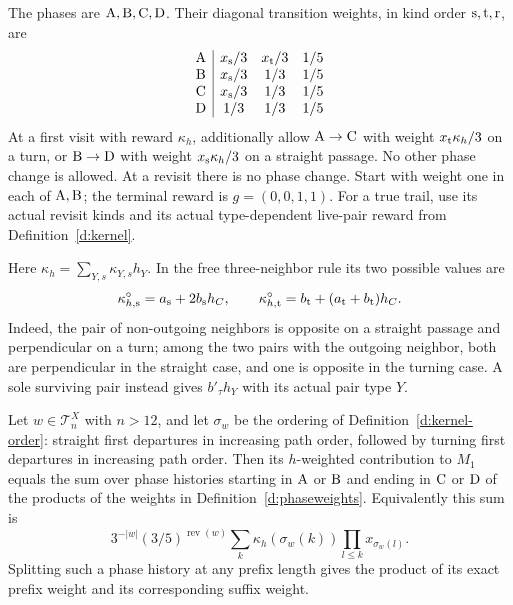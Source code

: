 \begin{definition}\label{d:phaseweights}
The phases are \({\rm A},{\rm B},{\rm C},{\rm D}\). Their
diagonal transition weights, in kind order \({\rm s},{\rm t},{\rm r}\), are
\[
 \begin{array}{c|ccc}
 {\rm A}&x_{\rm s}/3&x_{\rm t}/3&1/5\\
 {\rm B}&x_{\rm s}/3&1/3&1/5\\
 {\rm C}&x_{\rm s}/3&1/3&1/5\\
 {\rm D}&1/3&1/3&1/5
 \end{array}
\]
At a first visit with reward \(\kappa_h\), additionally allow
\({\rm A}\to{\rm C}\) with weight \(x_{\rm t}\kappa_h/3\) on a turn,
or \({\rm B}\to{\rm D}\) with weight \(x_{\rm s}\kappa_h/3\)
on a straight passage. No other phase change is allowed.
At a revisit there is no phase change.
Start with weight one in each of \({\rm A},{\rm B}\);
the terminal reward is \(g=(0,0,1,1)\).
For a true trail, use its actual revisit kinds and its actual
type-dependent live-pair reward from Definition~\ref{d:kernel}.
\end{definition}

Here \(\kappa_h=\sum_{Y,s}\kappa_{Y,s}h_Y\). In the free
three-neighbor rule its two possible values are
\[
 \kappa_{h,\rm s}^{\circ}=a_{\rm s}+2b_{\rm s}h_C,
 \qquad
 \kappa_{h,\rm t}^{\circ}=b_{\rm t}+(a_{\rm t}+b_{\rm t})h_C.
\]
Indeed, the pair of non-outgoing neighbors is opposite on a
straight passage and perpendicular on a turn; among the two pairs
with the outgoing neighbor, both are perpendicular in the straight
case, and one is opposite in the turning case. A sole surviving
pair instead gives \(b'_\tau h_Y\) with its actual pair type \(Y\).

\begin{lemma}\label{l:phase-expansion}
Let \(w\in\mathcal T_n^X\) with \(n>12\), and let \(\sigma_w\)
be the ordering of Definition~\ref{d:kernel-order}: straight first
departures in increasing path order, followed by turning first
departures in increasing path order. Then its \(h\)-weighted
contribution to \(M_1\) equals the sum over phase histories starting in
\({\rm A}\) or \({\rm B}\) and ending in \({\rm C}\) or \({\rm D}\)
of the products of the weights in Definition~\ref{d:phaseweights}.
Equivalently this sum is
\[
 3^{-|w|}(3/5)^{\operatorname{rev}(w)}
       \sum_k\kappa_h(\sigma_w(k))\prod_{l\le k}x_{\sigma_w(l)}.
\]
Splitting such a phase history at any prefix length gives the
product of its exact prefix weight and its corresponding suffix weight.
\end{lemma}

